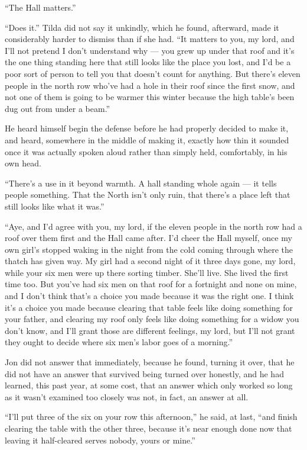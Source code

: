“The Hall matters.”

“Does it.” Tilda did not say it unkindly, which he found, afterward, made it considerably harder to dismiss than if she had. “It matters to you, my lord, and I’ll not pretend I don’t understand why — you grew up under that roof and it’s the one thing standing here that still looks like the place you lost, and I’d be a poor sort of person to tell you that doesn’t count for anything. But there’s eleven people in the north row who’ve had a hole in their roof since the first snow, and not one of them is going to be warmer this winter because the high table’s been dug out from under a beam.”

\sceneBreak

He heard himself begin the defense before he had properly decided to make it, and heard, somewhere in the middle of making it, exactly how thin it sounded once it was actually spoken aloud rather than simply held, comfortably, in his own head.

“There’s a use in it beyond warmth. A hall standing whole again — it tells people something. That the North isn’t only ruin, that there’s a place left that still looks like what it was.”

“Aye, and I’d agree with you, my lord, if the eleven people in the north row had a roof over them first and the Hall came after. I’d cheer the Hall myself, once my own girl’s stopped waking in the night from the cold coming through where the thatch has given way. My girl had a second night of it three days gone, my lord, while your six men were up there sorting timber. She’ll live. She lived the first time too. But you’ve had six men on that roof for a fortnight and none on mine, and I don’t think that’s a choice you made because it was the right one. I think it’s a choice you made because clearing that table feels like doing something for your father, and clearing my roof only feels like doing something for a widow you don’t know, and I’ll grant those are different feelings, my lord, but I’ll not grant they ought to decide where six men’s labor goes of a morning.”

\sceneBreak

Jon did not answer that immediately, because he found, turning it over, that he did not have an answer that survived being turned over honestly, and he had learned, this past year, at some cost, that an answer which only worked so long as it wasn’t examined too closely was not, in fact, an answer at all.

“I’ll put three of the six on your row this afternoon,” he said, at last, “and finish clearing the table with the other three, because it’s near enough done now that leaving it half-cleared serves nobody, yours or mine.”

